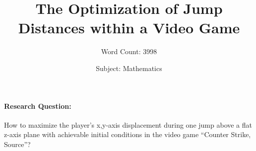 \documentclass[a4paper,12pt]{article}
\title{The Optimization of Jump Distances within a Video Game}
\author{Word Count: 3998}
\date{Subject: Mathematics}
\numberwithin{equation}{section}
\begin{document}
    \maketitle

    \paragraph{Research Question:} How to maximize the player's x,y-axis displacement during one jump above a flat z-axis plane with achievable initial conditions in the video game ``Counter Strike, Source''?

    \newpage

    \newpage

    \tableofcontents

    \newpage



























%
%



\newpage
{}
\printbibliography


%
\end{document}
